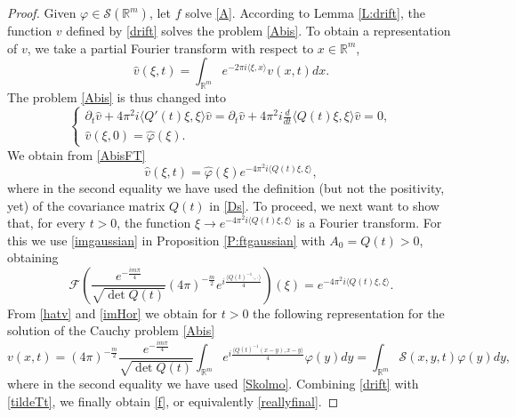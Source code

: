\documentclass[11pt,a4paper]{amsart}
\def \vf{\varphi}
\def \So {\mathscr{S}(\Rm)}
\newcommand{\Rm}{\mathbb R^m}
\newcommand{\p}{\partial}
\numberwithin{equation}{section}
\newcommand{\sa}{\langle}
\newcommand{\da}{\rangle}
\numberwithin{equation}{section}
\begin{document}
\begin{proof}
Given $\vf\in \So$, let $f$ solve \eqref{A}. According to Lemma \ref{L:drift}, the function $v$ defined by \eqref{drift} solves the problem \eqref{Abis}. To obtain a representation of $v$, we take a partial Fourier transform with respect to $x\in \Rm$,
\[
\hat v(\xi,t) = \int_{\Rm} e^{-2\pi i\sa \xi,x\da} v(x,t) dx.
\]
The problem \eqref{Abis} is thus changed into
\begin{equation}\label{AbisFT}
\begin{cases}
\p_t \hat v + 4\pi^2 i \sa Q'(t) \xi,\xi\da \hat v = \p_t \hat v + 4\pi^2 i \frac{d}{dt} \sa Q(t) \xi,\xi\da \hat v = 0,
\\
\hat v(\xi,0) = \hat \vf(\xi).
\end{cases}
\end{equation} 
We obtain from \eqref{AbisFT}
\begin{equation}\label{hatv}
\hat v(\xi,t) = \hat \vf(\xi) e^{-4\pi^2 i \sa Q(t) \xi,\xi\da},
\end{equation}
where in the second equality we have used the definition (but not the positivity, yet) of the covariance matrix $Q(t)$ in \eqref{Ds}. To proceed, we next want to show that, for every $t>0$, the function $\xi\to e^{-4\pi^2 i  \sa Q(t) \xi,\xi\da}$ is a Fourier transform. 
For this we use \eqref{imgaussian}  in Proposition \ref{P:ftgaussian} with $A_0 = Q(t)>0$, obtaining
\begin{equation}\label{imHor}
\mathscr F\left(\frac{e^{-\frac{i m\pi}4}}{\sqrt{\det{Q(t)}}}(4\pi
)^{-\frac{m}{2}} e^{i \frac{\sa Q(t)^{-1}\cdot,\cdot\da}{4}}\right)(\xi) =
e^{- 4 \pi^2 i \sa Q(t)\xi,\xi\da}.
\end{equation}
From \eqref{hatv} and \eqref{imHor} we obtain for $t>0$ the following representation for the solution of the Cauchy problem \eqref{Abis} 
\begin{equation}\label{tildeTt}
v(x,t)  = (4\pi
)^{-\frac{m}{2}} \frac{e^{-\frac{i m\pi}4}}{\sqrt{\det Q(t)}} \int_{\Rm}  e^{i \frac{\sa Q(t)^{-1}(x-y),x-y\da}{4}} \vf(y) dy = \int_{\Rm} \mathcal S(x,y,t) \vf(y) dy,
\end{equation}
where in the second equality we have used \eqref{Skolmo}.
Combining \eqref{drift} with \eqref{tildeTt}, we finally obtain \eqref{f}, or equivalently \eqref{reallyfinal}. 


\end{proof}
\end{document}
